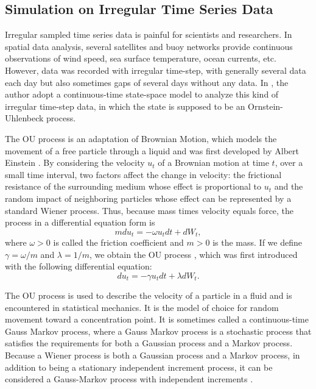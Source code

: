 \subsection{Simulation on Irregular Time Series Data}

Irregular sampled time series data is painful for scientists and researchers. In spatial data analysis, several satellites and buoy networks provide continuous observations of wind speed, sea surface temperature, ocean currents, etc. However, data was recorded with irregular time-step, with generally several data each day but also sometimes gaps of several days without any data. In \cite{tandeo2011linear}, the author adopt a continuous-time state-space model to analyze this kind of irregular time-step data, in which the state is supposed to be an Ornstein-Uhlenbeck process. 

The OU process is an adaptation of Brownian Motion, which models the movement of a free particle through a liquid and was first developed by Albert Einstein \cite{einstein1956investigations}. 
By considering the velocity $u_t$ of a Brownian motion at time $t$, over a small time interval, two factors affect the change in velocity: the frictional resistance of the surrounding medium whose effect is proportional to $u_t$ and the random impact of neighboring particles whose effect can be represented by a standard Wiener process. Thus, because mass times velocity equals force, the process in a differential equation form is 
\begin{equation*}
mdu_t = -\omega u_tdt+dW_t,
\end{equation*}
where $\omega>0$ is called the friction coefficient and $m>0$ is the mass. If we define $\gamma = \omega /m$ and $\lambda = 1/m$, we obtain the OU process \cite{vaughan2015goodness}, which was first introduced with the following differential equation:
\begin{equation*}
du_t= -\gamma u_tdt+\lambda dW_t.
\end{equation*}


The OU process is used to describe the velocity of a particle in a fluid and is encountered in statistical mechanics. It is the model of choice for random movement toward a concentration point. It is sometimes called a continuous-time Gauss Markov process, where a Gauss Markov process is a stochastic process that satisfies the requirements for both a Gaussian process and a Markov process. Because a Wiener process is both a Gaussian process and a Markov process, in addition to being a stationary independent increment process, it can be considered a Gauss-Markov process with independent increments \cite{kijima1997markov}. 

